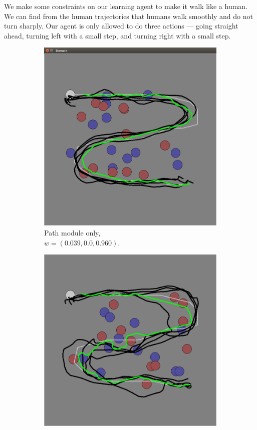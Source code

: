 \documentclass[11pt]{article} %
\begin{document}
We make some constraints on our learning agent to make it walk like a human.
We can find from the human trajectories that humans walk smoothly and do not turn
sharply.  Our agent is only allowed to do three actions --- going straight ahead,
turning left with a small step, and turning right with a small step.

\begin{figure}[h]
\centering
\begin{subfigure}[b]{0.24\textwidth}
\includegraphics[width=\textwidth]{task_1.png}
\caption{Path module only,\\$w = (0.039, 0.0, 0.960)$. }
\end{subfigure}
\begin{subfigure}[b]{0.24\textwidth}
\includegraphics[width=\textwidth]{task_2.png}

\end{subfigure}
\end{figure}
\end{document}
